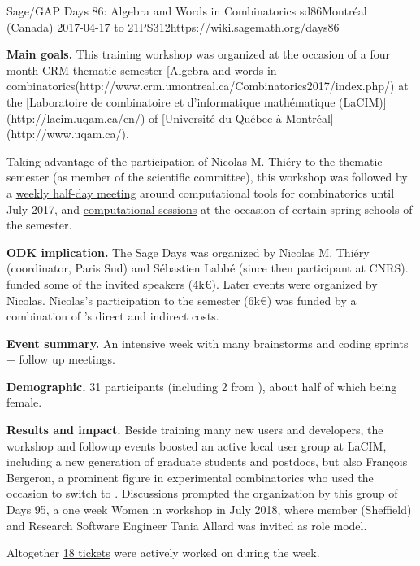 \begin{event}{Sage/GAP Days 86: Algebra and Words in Combinatorics }{sd86}{Montréal (Canada) 2017-04-17 to 21}{PS}{31}{2}{https://wiki.sagemath.org/days86}

  \textbf{Main goals.} This training workshop was organized at the
  occasion of a four month CRM thematic semester
  [Algebra and words in combinatorics(http://www.crm.umontreal.ca/Combinatorics2017/index.php/)
  at the [Laboratoire de combinatoire et d'informatique mathématique (LaCIM)](http://lacim.uqam.ca/en/) of
  [Université du Québec à Montréal](http://www.uqam.ca/).

  Taking advantage of the participation of Nicolas M. Thiéry to the
  thematic semester (as member of the scientific committee), this
  workshop was followed by a
  \href{https://wiki.sagemath.org/Montreal}{weekly half-day meeting}
  around computational tools for combinatorics until July 2017, and
  \href{https://more-sagemath-tutorials.readthedocs.io/en/latest/2017-05-29-CRM/}{computational
    sessions} at the occasion of certain spring schools of the
  semester.

  \textbf{ODK implication.} The Sage Days was organized by Nicolas M.
  Thiéry (\ODK coordinator, Paris Sud) and Sébastien Labbé (since then
  \ODK participant at CNRS). \ODK funded some of the invited speakers
  (\approx 4k€). Later events were organized by Nicolas. Nicolas's
  participation to the semester (\approx 6k€) was funded by a
  combination of \ODK's direct and indirect costs.

  \textbf{Event summary.} An intensive week with many brainstorms and
  coding sprints + follow up meetings.

  \textbf{Demographic.} 31 participants (including 2 from \ODK), about
  half of which being female.

  \textbf{Results and impact.} Beside training many new \Sage users
  and developers, the workshop and followup events boosted an active
  local user group at LaCIM, including a new generation of graduate
  students and postdocs, but also François Bergeron, a prominent
  figure in experimental combinatorics who used the occasion to switch
  to \Sage. Discussions prompted the organization by this group of
  \Sage Days 95, a one week Women in \Sage workshop in July 2018,
  where \ODK member (Sheffield) and Research Software Engineer Tania
  Allard was invited as role model.

  Altogether
  \href{https://trac.sagemath.org/query?status=closed&status=needs_info&status=needs_review&status=needs_work&status=new&status=positive_review&keywords=~days86&col=id&col=summary&col=status&col=time&col=changetime&col=author&col=reviewer&order=status}{18
    \Sage tickets} were actively worked on during the week.
\end{event}
